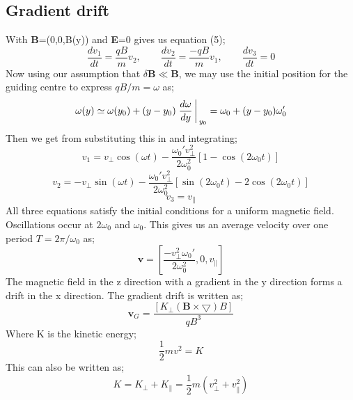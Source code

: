 \documentclass[14paper,11pt,hidelinks]{article}
\begin{document}
\subsection{Gradient drift} 
With \textbf{B}=(0,0,B(y)) and \textbf{E}=0 gives us equation (5);
\begin{equation}
\frac{dv_1}{dt}=\frac{qB}{m}v_2,
\qquad
\frac{dv_2}{dt}=\frac{-qB}{m}v_1,
\qquad
\frac{dv_3}{dt}=0
\end{equation}
Now using our assumption that \begin{math} \delta\mathbf{B}\ll\mathbf{B} \end{math}, we may use the initial position for the guiding centre to express \begin{math}qB/m=\omega\end{math} as;
\begin{equation}
\omega(y)\simeq\omega(y_0)+(y-y_0)\left.\frac{d\omega}{dy}\right\arrowvert_{y_0}=\omega_0+(y-y_0)\omega_0'
\end{equation}
Then we get from substituting this in and integrating;
\begin{equation}
v_1=v_\bot\cos(\omega t)-\frac{\omega_0' v_\bot^2}{2\omega_0^2}[1-\cos(2\omega_0 t)]
\end{equation}
\begin{equation}
v_2=-v_\bot\sin(\omega t)-\frac{\omega_0' v_\bot^2}{2\omega_0^2}[\sin(2\omega_0 t)-2\cos(2\omega_0 t)]
\end{equation}
\begin{equation}
v_3=v_\parallel
\end{equation}
All three equations satisfy the initial conditions for a uniform magnetic field. Oscillations occur at \begin{math} 2\omega_0\end{math} and \begin{math} \omega_0\end{math}. This gives us an average velocity over one period \begin{math} T=2\pi/\omega_0\end{math} as;
\begin{equation}
\mathbf{v}=\left[\frac{-v_\bot^2\omega_0'}{2\omega_0^2},0,v_\parallel\right]
\end{equation}
The magnetic field in the z direction with a gradient in the y direction forms a drift in the x direction. The gradient drift is written as;
\begin{equation}
\mathbf{v}_G=\frac{\left[K_\bot(\mathbf{B}\times\bigtriangledown)B\right]}{q B^3} 
\end{equation}
Where K is the kinetic energy;
\begin{equation}
\frac{1}{2}mv^2=K
\end{equation}
This can also be written as;
\begin{equation}
K=K_\bot+K_\parallel=\frac{1}{2}m(v_\bot^2+v_\parallel^2)
\end{equation}
\end{document}
